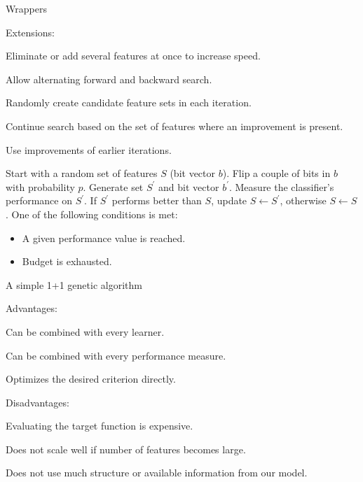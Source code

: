 \documentclass[11pt,compress,t,notes=noshow, xcolor=table]{beamer}
\begin{document}
\begin{vbframe}{Wrappers}
    \framebreak

    \begin{blocki}{Extensions:}
      \item Eliminate or add several features at once to increase speed.
      \item Allow alternating forward and backward search.
      \item Randomly create candidate feature sets in each iteration.
      \item Continue search based on the set of features where an improvement is present.
      \item Use improvements of earlier iterations.
    \end{blocki}

    \framebreak

    \begin{algorithm}[H]
    \begin{algorithmic}[1]
      \State Start with a random set of features $S$ (bit vector $b$).
      \Repeat
      \State Flip a couple of bits in $b$ with probability $p$.
      \State Generate set $S^\prime$ and bit vector $b^\prime$.
      \State Measure the classifier's performance on $S^\prime$.
      \State If $S^\prime$ performs better than $S$, update $S \leftarrow S^\prime$, otherwise $S \leftarrow S$.
      \Until One of the following conditions is met:
        \begin{itemize}
          \item A given performance value is reached.
          \item Budget is exhausted.
        \end{itemize}
        \caption{A simple 1+1 genetic algorithm}
    \end{algorithmic}
    \end{algorithm}

    \framebreak

    \begin{blocki}{Advantages:}
      \item Can be combined with every learner.
      \item Can be combined with every performance measure.
      \item Optimizes the desired criterion directly.
    \end{blocki}

    \lz

    \begin{blocki}{Disadvantages:}
      \item Evaluating the target function is expensive.
      \item Does not scale well if number of features becomes large.
      \item Does not use much structure or available information from our model.
    \end{blocki}


\end{vbframe}
\end{document}
